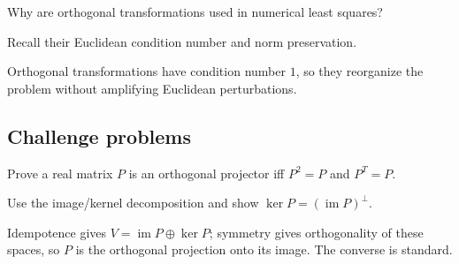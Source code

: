 \begin{exercise}[QR stability]\label{exr:i14-expand-14}
Why are orthogonal transformations used in numerical least squares?
\end{exercise}
\begin{hint}
Recall their Euclidean condition number and norm preservation.
\end{hint}
\begin{solution}
Orthogonal transformations have condition number \(1\), so they reorganize the problem without amplifying Euclidean perturbations.
\end{solution}

\subsection*{Challenge problems}

\begin{exercise}\label{exr:i14-expand-15}
Prove a real matrix \(P\) is an orthogonal projector iff \(P^2=P\) and \(P^T=P\).
\end{exercise}
\begin{hint}
Use the image/kernel decomposition and show \(\ker P=(\operatorname{im}P)^\perp\).
\end{hint}
\begin{solution}
Idempotence gives \(V=\operatorname{im}P\oplus\ker P\); symmetry gives orthogonality of these spaces, so \(P\) is the orthogonal projection onto its image. The converse is standard.
\end{solution}

